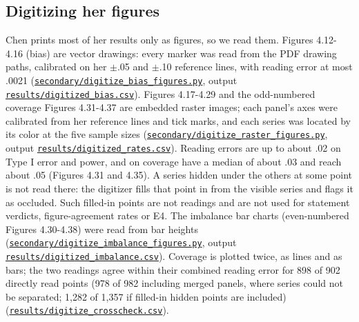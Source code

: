 \subsection{Digitizing her figures}\label{sec:digitize}

Chen prints most of her results only as figures, so we read them. Figures 4.12-4.16 (bias) are vector drawings: every marker was read from the PDF drawing paths, calibrated on her $\pm$.05 and $\pm$.10 reference lines, with reading error at most .0021 (\href{https://github.com/alectionary/vibe-math/blob/master/formalization/chen-rdd-mediation/secondary/digitize_bias_figures.py}{\nolinkurl{secondary/digitize_bias_figures.py}}, output \href{https://github.com/alectionary/vibe-math/blob/master/formalization/chen-rdd-mediation/results/digitized_bias.csv}{\nolinkurl{results/digitized_bias.csv}}). Figures 4.17-4.29 and the odd-numbered coverage Figures 4.31-4.37 are embedded raster images; each panel's axes were calibrated from her reference lines and tick marks, and each series was located by its color at the five sample sizes (\href{https://github.com/alectionary/vibe-math/blob/master/formalization/chen-rdd-mediation/secondary/digitize_raster_figures.py}{\nolinkurl{secondary/digitize_raster_figures.py}}, output \href{https://github.com/alectionary/vibe-math/blob/master/formalization/chen-rdd-mediation/results/digitized_rates.csv}{\nolinkurl{results/digitized_rates.csv}}). Reading errors are up to about .02 on Type I error and power, and on coverage have a median of about .03 and reach about .05 (Figures 4.31 and 4.35). A series hidden under the others at some point is not read there: the digitizer fills that point in from the visible series and flags it as occluded. Such filled-in points are not readings and are not used for statement verdicts, figure-agreement rates or E4. The imbalance bar charts (even-numbered Figures 4.30-4.38) were read from bar heights (\href{https://github.com/alectionary/vibe-math/blob/master/formalization/chen-rdd-mediation/secondary/digitize_imbalance_figures.py}{\nolinkurl{secondary/digitize_imbalance_figures.py}}, output \href{https://github.com/alectionary/vibe-math/blob/master/formalization/chen-rdd-mediation/results/digitized_imbalance.csv}{\nolinkurl{results/digitized_imbalance.csv}}). Coverage is plotted twice, as lines and as bars; the two readings agree within their combined reading error for 898 of 902 directly read points (978 of 982 including merged panels, where series could not be separated; 1,282 of 1,357 if filled-in hidden points are included) (\href{https://github.com/alectionary/vibe-math/blob/master/formalization/chen-rdd-mediation/results/digitize_crosscheck.csv}{\nolinkurl{results/digitize_crosscheck.csv}}).

